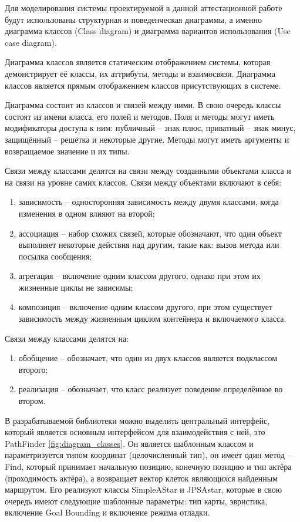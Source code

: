 Для моделирования системы проектируемой в данной аттестационной работе будут использованы структурная и поведенческая диаграммы, а именно диаграмма классов (Class diagram) и диаграмма вариантов использования (Use case diagram).

Диаграмма классов является статическим отображением системы, которая демонстрирует её классы, их аттрибуты, методы и взаимосвязи. Диаграмма классов является прямым отображением классов присутствующих в системе.

Диаграмма состоит из классов и связей между ними. В свою очередь классы состоят из имени класса, его полей и методов. Поля и методы могут иметь модификаторы доступа к ним: публичный -- знак плюс, приватный -- знак минус, защищённый -- решётка и некоторые другие. Методы могут иметь аргументы и возвращаемое значение и их типы.

Связи между классами делятся на связи между созданными объектами класса и на связи на уровне самих классов. Связи между объектами включают в себя:

\begin{enumerate}
	\item зависимость -- односторонняя зависимость между двумя классами, когда изменения в одном влияют на второй;
	\item ассоциация -- набор схожих связей, которые обозначают, что один объект выполняет некоторые действия над другим, такие как: вызов метода или посылка сообщения;
	\item агрегация -- включение одним классом другого, однако при этом их жизненные циклы не зависимы;
	\item композиция -- включение одним классом другого, при этом существует зависимость между жизненным циклом контейнера и включаемого класса.
\end{enumerate}

Связи между классами делятся на:

\begin{enumerate}
	\item обобщение -- обозначает, что один из двух классов является подклассом второго;
	\item реализация -- обозначает, что класс реализует поведение определённое во втором.
\end{enumerate}

В разрабатываемой библиотеки можно выделить центральный интерфейс, который является основным интерфейсом для взаимодействия с ней, это PathFinder \cref{fig:diagram_classes}. Он является шаблонным классом и параметризуется типом координат (целочисленный тип), он имеет один метод -- Find, который принимает начальную позицию, конечную позицию и тип актёра (проходимость актёра), а возвращает вектор клеток являющихся найденным маршрутом. Его реализуют классы SimpleAStar и JPSAstar, которые в свою очередь имеют следующие шаблонные параметры: тип карты, эвристика, включение Goal Bounding и включение режима отладки.  

